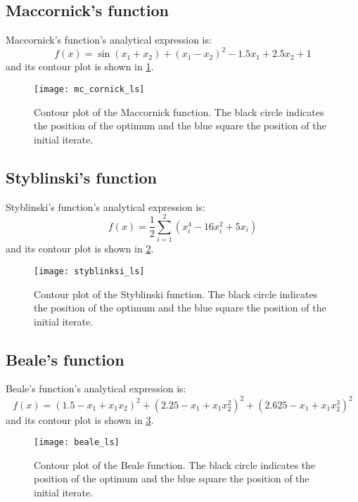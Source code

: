{{		\subsection*{Maccornick's function}
		{
			Maccornick's function's analytical expression is:
			\begin{equation}
				f(x) = \sin{(x_1+x_2)} + (x_1-x_2)^2 -1.5x_1 + 2.5x_2 +1 
			\end{equation}
			and its contour plot is shown in \ref{fig::Maccornick}.
			
			\begin{figure}[h!]
				\begin{center}
					\texttt{[image: mc\_cornick\_ls]}
					\caption[Contour plot of the Rastrigin function]{Contour plot of the Maccornick function. The black circle indicates the position of the optimum and the blue square the position of the initial iterate.}
					\label{fig::Maccornick}
				\end{center}
			\end{figure}
		}
		
		\subsection*{Styblinski's function}
		{
			Styblinski's function's analytical expression is:
			\begin{equation}
				f(x) = \frac{1}{2} \sum_{i=1}^2 (x_i^4 - 16x_i^2+5x_i)
			\end{equation}
			and its contour plot is shown in \ref{fig::Styblinski}.
			
			\begin{figure}[h!]
				\begin{center}
					\texttt{[image: styblinksi\_ls]}
					\caption[Contour plot of the Styblinski function]{Contour plot of the Styblinski function. The black circle indicates the position of the optimum and the blue square the position of the initial iterate.}
					\label{fig::Styblinski}
				\end{center}
			\end{figure}
		}
		
		\subsection*{Beale's function}
		{
			Beale's function's analytical expression is:
			\begin{equation}
				f(x) = (1.5-x_1+x_1x_2)^2 + (2.25-x_1+x_1x_2^2)^2 + (2.625-x_1+x_1x_2^3)^2
			\end{equation}
			and its contour plot is shown in \ref{fig::Beale}.
			
			\begin{figure}[h!]
				\begin{center}
					\texttt{[image: beale\_ls]}
					\caption[Contour plot of the Beale function]{Contour plot of the Beale function. The black circle indicates the position of the optimum and the blue square the position of the initial iterate.}
					\label{fig::Beale}
				\end{center}
			\end{figure}
		}
	}
}